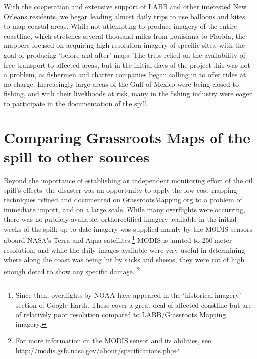 \documentclass[11pt,oneside,notitlepage]{report}
\begin{document}
{{With the cooperation and extensive support of \ac{LABB} and other interested New Orleans residents, we began leading almost daily trips to use balloons and kites to map coastal areas. While not attempting to produce imagery of the entire coastline, which stretches several thousand miles from Louisiana to Florida, the mappers focused on acquiring high resolution imagery of specific sites, with the goal of producing `before and after' maps. The trips relied on the availability of free transport to affected areas, but in the initial days of the project this was not a problem, as fishermen and charter companies began calling in to offer rides at no charge. Increasingly large areas of the Gulf of Mexico were being closed to fishing, and with their livelihoods at risk, many in the fishing industry were eager to participate in the documentation of the spill. \cite{noaa2010oil}

\section{Comparing Grassroots Maps of the spill to other sources}

Beyond the importance of establishing an independent monitoring effort of the oil spill's effects, the disaster was an opportunity to apply the low-cost mapping techniques refined and documented on GrassrootsMapping.org to a problem of immediate import, and on a large scale. While many overflights were occurring, there was no publicly available, orthorectified imagery available in the initial weeks of the spill; up-to-date imagery was supplied mainly by the \ac{MODIS} sensors aboard NASA's Terra and Aqua satellites.\footnote{Since then, overflights by \ac{NOAA} have appeared in the `historical imagery' section of Google Earth. These cover a great deal of affected coastline but are of relatively poor resolution compared to \ac{LABB}/Grassroots Mapping imagery.} MODIS is limited to 250 meter resolution, and while the daily images available were very useful in determining where along the coast was being hit by slicks and sheens, they were not of high enough detail to show any specific damage. \cite{lotliker2009modis}\footnote{For more information on the \ac{MODIS} sensor and its abilities, see \url{http://modis.gsfc.nasa.gov/about/specifications.php}}

}}
\end{document}

